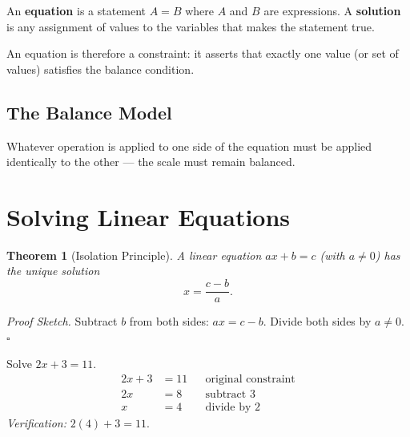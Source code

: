 \documentclass[11pt, openany]{book}
\theoremstyle{plain}
\newtheorem{theorem}{Theorem}[chapter]
\theoremstyle{definition}
\theoremstyle{remark}
\newenvironment{proofsketch}{\noindent\textit{Proof Sketch.}\;}{\hfill$\square$\par\medskip}
\begin{document}
\begin{mydefinition}
An \textbf{equation} is a statement $A=B$ where $A$ and $B$ are expressions.
A \textbf{solution} is any assignment of values to the variables that makes
the statement true.
\end{mydefinition}

An equation is therefore a constraint: it asserts that exactly one value (or
set of values) satisfies the balance condition.

\subsection{The Balance Model}

\begin{center}
\end{center}

Whatever operation is applied to one side of the equation must be applied
identically to the other --- the scale must remain balanced.

\section{Solving Linear Equations}

\begin{theorem}[Isolation Principle]
A linear equation $ax+b=c$ (with $a\ne0$) has the unique solution
\[
  x = \frac{c-b}{a}.
\]
\end{theorem}

\begin{proofsketch}
Subtract $b$ from both sides: $ax=c-b$. Divide both sides by $a\ne0$.
\end{proofsketch}

\begin{myexample}
Solve $2x+3=11$.
\begin{align*}
  2x+3 &= 11 && \text{original constraint}\\
  2x   &= 8  && \text{subtract }3\\
  x    &= 4  && \text{divide by }2
\end{align*}
\textit{Verification:} $2(4)+3=11$. \checkmark
\end{myexample}
\end{document}
